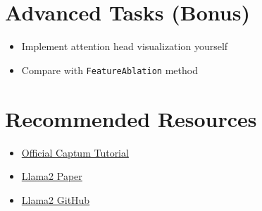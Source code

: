 \section*{Advanced Tasks (Bonus)}
\begin{itemize}
\item Implement attention head visualization yourself
\item Compare with \texttt{FeatureAblation} method

\end{itemize}

\section*{Recommended Resources}
\begin{itemize}
\item \href{https://captum.ai/tutorials/Llama2_LLM_Attribution}{Official Captum Tutorial}
\item \href{https://arxiv.org/abs/2307.03381}{Llama2 Paper}
\item \href{https://github.com/facebookresearch/llama}{Llama2 GitHub}
\end{itemize}
